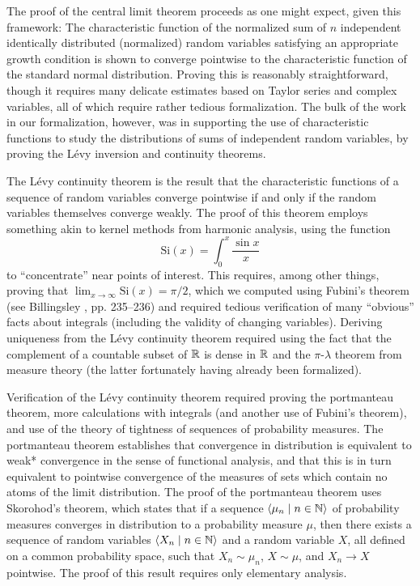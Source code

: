 \documentclass{article}
\theoremstyle{definition}
\newcommand{\bldseq}[2]{\langle{#1}\mid{#2}\rangle}
\newcommand\Si{\text{Si}}
\begin{document}
The proof of the central limit theorem proceeds as one might expect, given this framework: The characteristic function of the normalized sum of $n$ independent identically distributed (normalized) random variables satisfying an appropriate growth condition is shown to converge pointwise to the characteristic function of the standard normal distribution. Proving this is reasonably straightforward, though it requires many delicate estimates based on Taylor series and complex variables, all of which require rather tedious formalization. The bulk of the work in our formalization, however, was in supporting the use of characteristic functions to study the distributions of sums of independent random variables, by proving the L\'evy inversion and continuity theorems.

The L\'evy continuity theorem is the result that the characteristic functions of a sequence of random variables converge pointwise if and only if the random variables themselves converge weakly. The proof of this theorem employs something akin to kernel methods from harmonic analysis, using the function
\[ \Si(x) = \int_0^x \frac{\sin x}{x} \]
to ``concentrate'' near points of interest. This requires, among other things, proving that $\lim_{x \rightarrow \infty} \Si(x) = \pi/2$, which we computed using Fubini's theorem (see Billingsley \cite{billingsley}, pp. 235--236) and required tedious verification of many ``obvious'' facts about integrals (including the validity of changing variables). Deriving uniqueness from the L\'evy continuity theorem required using the fact that the complement of a countable subset of $\mathbb{R}$ is dense in $\mathbb{R}$ and the $\pi$-$\lambda$ theorem from measure theory (the latter fortunately having already been formalized).

Verification of the L\'evy continuity theorem required proving the portmanteau theorem, more calculations with integrals (and another use of Fubini's theorem), and use of the theory of tightness of sequences of probability measures. The portmanteau theorem establishes that convergence in distribution is equivalent to weak* convergence in the sense of functional analysis, and that this is in turn equivalent to pointwise convergence of the measures of sets which contain no atoms of the limit distribution. The proof of the portmanteau theorem uses Skorohod's theorem, which states that if a sequence $\bldseq{\mu_n}{n \in \N}$ of probability measures converges in distribution to a probability measure $\mu$, then there exists a sequence of random variables $\bldseq{X_n}{n \in \N}$ and a random variable $X$, all defined on a common probability space, such that $X_n \sim \mu_n$, $X \sim \mu$, and $X_n \rightarrow X$ pointwise. The proof of this result requires only elementary analysis.
\end{document}
